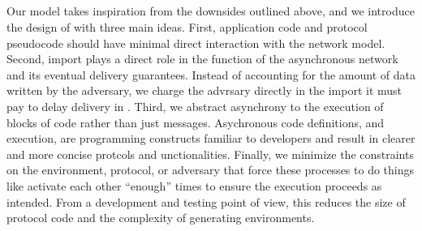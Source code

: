 %

\subsection{\fwrapper}
Our model takes inspiration from the downsides outlined above, and we introduce the design of \fwrapper with three main ideas.
First, application code and protocol pseudocode should have minimal direct interaction with the network model. 
Second, import plays a direct role in the function of the asynchronous network and its eventual delivery guarantees. 
Instead of accounting for the amount of data written by the adversary, we charge the advrsary directly in the import it must pay to delay delivery in \fwrapper.
Third, we abstract asynchrony to the execution of blocks of code rather than just messages.
Asychronous code definitions, and execution, are programming constructs familiar to developers and result in clearer and more concise protcols and unctionalities.
Finally, we minimize the constraints on the environment, protocol, or adversary that force these processes to do things like activate each other ``enough'' times to ensure the execution proceeds as intended.
From a development and testing point of view, this reduces the size of protocol code and the complexity of generating environments.

